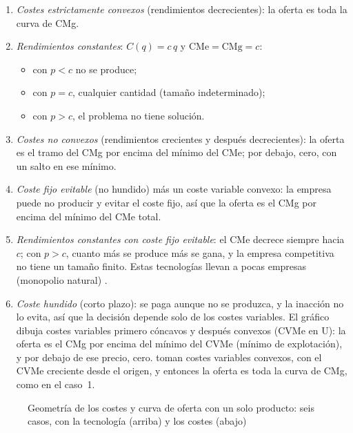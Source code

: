 \documentclass[11pt]{article}
\begin{document}
\begin{enumerate}
\item \emph{Costes estrictamente convexos} (rendimientos decrecientes): la oferta es toda la curva de CMg.
\item \emph{Rendimientos constantes}: $C(q)=c\,q$ y $\mathrm{CMe}=\mathrm{CMg}=c$:
  \begin{itemize}
  \item con $p<c$ no se produce;
  \item con $p=c$, cualquier cantidad (tamaño indeterminado);
  \item con $p>c$, el problema no tiene solución.
  \end{itemize}
\item \emph{Costes no convexos} (rendimientos crecientes y después decrecientes): la oferta es el tramo del CMg por encima del mínimo del CMe; por debajo, cero, con un salto en ese mínimo.
\item \emph{Coste fijo evitable} (no hundido) más un coste variable convexo: la empresa puede no producir y evitar el coste fijo, así que la oferta es el CMg por encima del mínimo del CMe total.
\item \emph{Rendimientos constantes con coste fijo evitable}: el CMe decrece siempre hacia $c$; con $p>c$, cuanto más se produce más se gana, y la empresa competitiva no tiene un tamaño finito. Estas tecnologías llevan a pocas empresas (monopolio natural) .
\item \emph{Coste hundido} (corto plazo): se paga aunque no se produzca, y la inacción no lo evita, así que la decisión depende solo de los costes variables. El gráfico dibuja costes variables primero cóncavos y después convexos (CVMe en U): la oferta es el CMg por encima del mínimo del CVMe (mínimo de explotación), y por debajo de ese precio, cero. \textcite[§5.D]{MasColellWhinstonGreen1995} toman costes variables convexos, con el CVMe creciente desde el origen, y entonces la oferta es toda la curva de CMg, como en el caso~1.
\end{enumerate}

\begin{figure}[H]
\centering
\caption{Geometría de los costes y curva de oferta con un solo producto: seis casos, con la tecnología (arriba) y los costes (abajo)}\label{fig:geometria-costes}
\end{figure}
\end{document}
